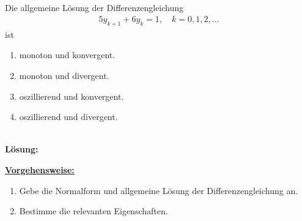 \subsection*{}
Die allgemeine Lösung der Differenzengleichung
\begin{align*}
5 y_{k+1} + 6 y_k = 1 , \quad k = 0,1,2,...
\end{align*}
ist
\renewcommand{\labelenumi}{(\alph{enumi})}
\begin{enumerate}
\item 
monoton und konvergent.
\item
monoton und divergent.
\item
oszillierend und konvergent.
\item
oszillierend und divergent.
\end{enumerate}
\ \\
\textbf{Lösung:}
\begin{mdframed}
\underline{\textbf{Vorgehensweise:}}
\renewcommand{\labelenumi}{\theenumi.}
\begin{enumerate}
\item Gebe die Normalform und allgemeine Lösung der Differenzengleichung an.
\item 
Bestimme die relevanten Eigenschaften.
\end{enumerate}
\end{mdframed}

